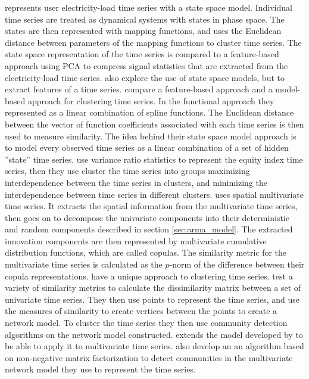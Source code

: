 \textcite{load_tsc_state_space_model} represents user electricity-load time series with a state space model. Individual time series are treated as dynamical systems with states in phase space. 
The states are then represented with mapping functions, and uses the Euclidean distance between parameters of the mapping functions to cluster time series.
The state space representation of the time series is compared to a feature-based approach using PCA to compress signal statistics that are extracted from the electricity-load time series.
\textcite{stock_price_tsc_regr_trees_som} also explore the use of state space models, but to extract features of a time series.
\textcite{hier_clust_w_state_space_models} compare a feature-based approach and a model-based approach for clustering time series. 
In the functional approach they represented as a linear combination of spline functions. 
The Euclidean distance between the vector of function coefficients associated with each time series is then used to measure similarity.
The idea behind their state space model approach is to model every observed time series as a linear combination of a set of hidden ''state'' time series. 
\textcite{financial_tsc_variance_ratio} use variance ratio statistics to represent the equity index time series, then they use cluster the time series into groups maximizing interdependence between the time series in clusters, and minimizing the interdependence between time series in different clusters. 
\textcite{copula_fuzzy_tsc_spatial} uses spatial multivariate time series. 
It extracts the spatial information from the multivariate time series, then goes on to decompose the univariate components into their deterministic and random components described in section \ref{sec:arma_model}.
The extracted innovation components are then represented by multivariate cumulative distribution functions, which are called copulas. 
The similarity metric for the multivariate time series is calculated as the $p$-norm of the difference between their copula representations.
\textcite{community_detection_networks_tsc, multivar_tsc_community_detection} have a unique approach to clustering time series. 
\textcite{community_detection_networks_tsc} test a variety of similarity metrics to calculate the dissimilarity matrix between a set of univariate time series. 
They then use points to represent the time series, and use the measures of similarity to create vertices between the points to create a network model. 
To cluster the time series they then use community detection algorithms on the network model constructed. 
\textcite{multivar_tsc_community_detection} extends the model developed by \textcite{community_detection_networks_tsc} to be able to apply it to multivariate time series.
\textcite{multivar_tsc_community_detection} also develop an an algorithm based on non-negative matrix factorization to detect communities in the multivariate network model they use to represent the time series.

